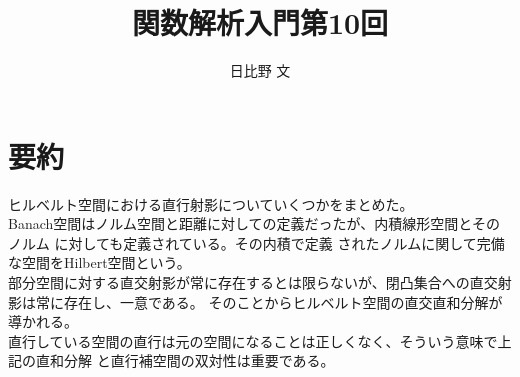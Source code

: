 \documentclass[12pt,a4paper]{ltjsarticle}
\begin{document}
\title{関数解析入門第10回}
\author{日比野 文}
\maketitle

\section{要約}
ヒルベルト空間における直行射影についていくつかをまとめた。\\
Banach空間はノルム空間と距離に対しての定義だったが、内積線形空間とそのノルム
に対しても定義されている。その内積で定義
されたノルムに関して完備な空間をHilbert空間という。\\
部分空間に対する直交射影が常に存在するとは限らないが、閉凸集合への直交射影は常に存在し、一意である。
そのことからヒルベルト空間の直交直和分解が導かれる。\\
直行している空間の直行は元の空間になることは正しくなく、そういう意味で上記の直和分解
と直行補空間の双対性は重要である。\\
\end{document}
